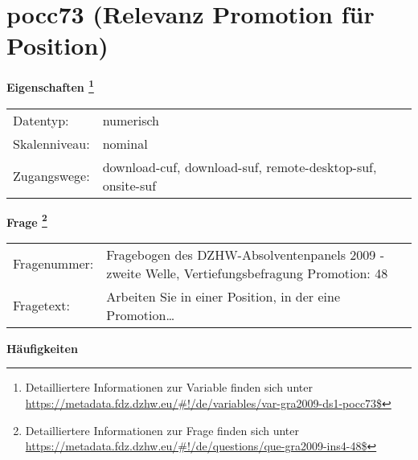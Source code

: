 
    \setcounter{footnote}{0}

    \vspace*{-1.8cm}
	\section{pocc73 (Relevanz Promotion für Position)}
	\label{section:pocc73}



    \vspace*{0.5cm}
    \noindent\textbf{Eigenschaften
	\footnote{Detailliertere Informationen zur Variable finden sich unter
		\url{https://metadata.fdz.dzhw.eu/\#!/de/variables/var-gra2009-ds1-pocc73$}}}\\
	\begin{tabularx}{\hsize}{@{}lX}
	Datentyp: & numerisch \\
	Skalenniveau: & nominal \\
	Zugangswege: &
	  download-cuf, 
	  download-suf, 
	  remote-desktop-suf, 
	  onsite-suf
 \\
    \end{tabularx}



				\vspace*{0.5cm}
                \noindent\textbf{Frage
	                \footnote{Detailliertere Informationen zur Frage finden sich unter
		              \url{https://metadata.fdz.dzhw.eu/\#!/de/questions/que-gra2009-ins4-48$}}}\\
				\begin{tabularx}{\hsize}{@{}lX}
					Fragenummer: &
					  Fragebogen des DZHW-Absolventenpanels 2009 - zweite Welle, Vertiefungsbefragung Promotion:
					  48
 \\
					Fragetext: & Arbeiten Sie in einer Position, in der eine Promotion… \\
				\end{tabularx}





        		\vspace*{0.5cm}
                \noindent\textbf{Häufigkeiten}

